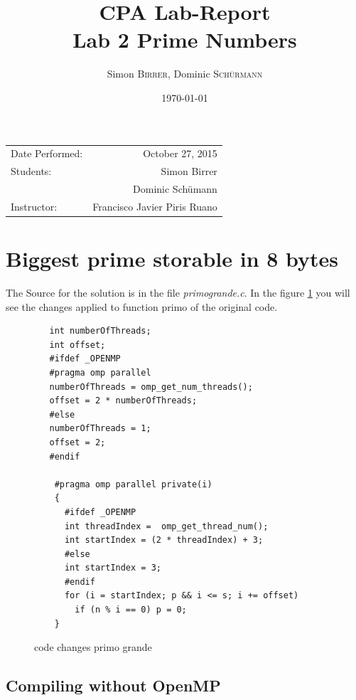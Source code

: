 \documentclass[11pt,a4paper]{article}
\title{CPA Lab-Report \\ Lab 2 Prime Numbers} %
\author{Simon \textsc{Birrer}, Dominic \textsc{Sch\"urmann}} %
\date{\today} %
\begin{document}
\maketitle %

\begin{center}
\begin{tabular}{l r}
Date Performed: & October 27, 2015 \\ %
Students: & Simon Birrer \\ %
& Dominic Sch\"umann \\
Instructor: & Francisco Javier Piris Ruano %
\end{tabular}
\end{center}

\bigskip

\tableofcontents

\pagebreak

\section{Biggest prime storable in 8 bytes}

The Source for the solution is in the file \textit{primo\textunderscore  grande.c}. In the figure \ref{code_primogrande} you will see the changes applied to function primo of the original code.


\begin{figure}[h]
\label{code_primogrande}
\begin{lstlisting}
   int numberOfThreads;
   int offset;
   #ifdef _OPENMP
   #pragma omp parallel
   numberOfThreads = omp_get_num_threads();
   offset = 2 * numberOfThreads;
   #else
   numberOfThreads = 1;
   offset = 2;
   #endif
    
    #pragma omp parallel private(i)
    {
      #ifdef _OPENMP
      int threadIndex =  omp_get_thread_num();
      int startIndex = (2 * threadIndex) + 3;
      #else
      int startIndex = 3;
      #endif
      for (i = startIndex; p && i <= s; i += offset)
        if (n % i == 0) p = 0;          
    }
\end{lstlisting} 
\caption{code changes primo grande}
\end{figure}


\subsection{Compiling without OpenMP}
\end{document}
